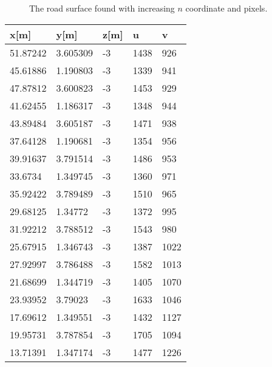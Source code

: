 \documentclass[12pt]{article}
\begin{document}
\begin{figure}[h]
    \centering
    \qquad
	\\
    \qquad
	\\
    \qquad
    \caption{The road surface found with increasing $n$ coordinate and pixels.}%
    \label{fig:multi_road}%
\end{figure}

\begin{table}[t]
    \begin{minipage}[]{.5\textwidth }
        \footnotesize
\begin{tabular}{|l|l|l|l|l|}
\hline
x[m]        & y[m]        & z[m]  & u    & v    \\
\hline
51.87242 & 3.605309 & -3 & 1438 & 926  \\
45.61886 & 1.190803 & -3 & 1339 & 941  \\
47.87812 & 3.600823 & -3 & 1453 & 929  \\
41.62455 & 1.186317 & -3 & 1348 & 944  \\
43.89484 & 3.605187 & -3 & 1471 & 938  \\
37.64128 & 1.190681 & -3 & 1354 & 956  \\
39.91637 & 3.791514 & -3 & 1486 & 953  \\
33.6734  & 1.349745 & -3 & 1360 & 971  \\
35.92422 & 3.789489 & -3 & 1510 & 965  \\
29.68125 & 1.34772  & -3 & 1372 & 995  \\
31.92212 & 3.788512 & -3 & 1543 & 980  \\
25.67915 & 1.346743 & -3 & 1387 & 1022 \\
27.92997 & 3.786488 & -3 & 1582 & 1013 \\
21.68699 & 1.344719 & -3 & 1405 & 1070 \\
23.93952 & 3.79023  & -3 & 1633 & 1046 \\
17.69612 & 1.349551 & -3 & 1432 & 1127 \\
19.95731 & 3.787854 & -3 & 1705 & 1094 \\
13.71391 & 1.347174 & -3 & 1477 & 1226 \\

\end{tabular}
\end{minipage}
\end{table}
\end{document}

